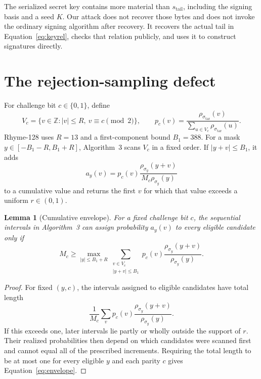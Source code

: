 \documentclass[11pt,a4paper]{article}
\newtheorem{lemma}[theorem]{Lemma}
\newcommand{\Z}{\mathbb{Z}}
\begin{document}
The serialized secret key contains more material than
$s_{\mathrm{tail}}$, including the signing basis and a seed $K$.  Our attack
does not recover those bytes and does not invoke the ordinary signing
algorithm after recovery.  It recovers the actual tail in
Equation~\eqref{eq:keyrel}, checks that relation publicly, and uses it to
construct signatures directly.

\section{The rejection-sampling defect}
\label{sec:defect}

For challenge bit $c\in\{0,1\}$, define
\begin{equation}
 V_c=\{v\in\Z:|v|\le R,\ v\equiv c\pmod 2\},\qquad
 p_c(v)=\frac{\rho_{\sigma_{\mathrm{tar}}}(v)}
               {\sum_{u\in V_c}\rho_{\sigma_{\mathrm{tar}}}(u)}.
                                                               \label{eq:pc}
\end{equation}
Rhyme-128 uses $R=13$ and a first-component bound $B_1=388$.  For a mask
$y\in[-B_1-R,B_1+R]$, Algorithm~3 scans $V_c$ in a fixed order.  If
$|y+v|\le B_1$, it adds
\begin{equation}
 a_y(v)=p_c(v)\frac{\rho_{\sigma_y}(y+v)}
                       {M_c\rho_{\sigma_y}(y)}         \label{eq:increment}
\end{equation}
to a cumulative value and returns the first $v$ for which that value exceeds
a uniform $r\in(0,1)$.

\begin{lemma}[Cumulative envelope]
\label{lem:envelope}
For a fixed challenge bit $c$, the sequential intervals in Algorithm~3 can
assign probability $a_y(v)$ to every eligible candidate only if
\begin{equation}
 M_c\ge
 \max_{|y|\le B_1+R}
 \sum_{\substack{v\in V_c\\|y+v|\le B_1}}
 p_c(v)\frac{\rho_{\sigma_y}(y+v)}{\rho_{\sigma_y}(y)}.
                                                               \label{eq:envelope}
\end{equation}
\end{lemma}

\begin{proof}
For fixed $(y,c)$, the intervals assigned to eligible candidates have total
length
\[
 \frac{1}{M_c}\sum_v p_c(v)
     \frac{\rho_{\sigma_y}(y+v)}{\rho_{\sigma_y}(y)}.
\]
If this exceeds one, later intervals lie partly or wholly outside the support
of $r$.  Their realized probabilities then depend on which candidates were
scanned first and cannot equal all of the prescribed increments.  Requiring
the total length to be at most one for every eligible $y$ and each parity
$c$ gives Equation~\eqref{eq:envelope}.
\end{proof}
\end{document}
